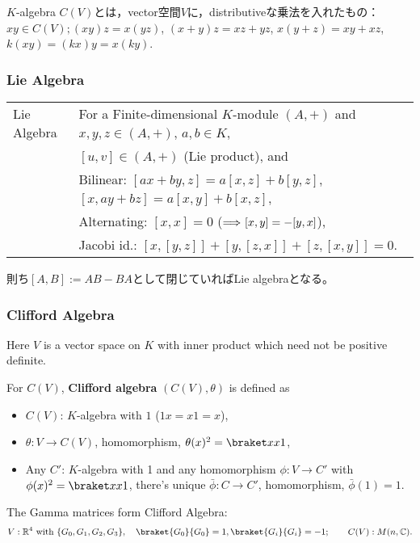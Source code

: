 \vspace{.5zw}

$K$-algebra $C(V)$とは，vector空間$V$に，distributiveな乗法を入れたもの：\\
\qquad$xy\in C(V);$\quad $(xy)z=x(yz)$, $(x+y)z=xz+yz$, $x(y+z)=xy+xz$, $k(xy)=(kx)y=x(ky)$.

\subsubsection{Lie Algebra}
\begin{tabular}{l@{ :\ \ \ }l}
Lie Algebra & For a Finite-dimensional $K$-module $(A,+)$ and $x,y,z\in(A,+)$, $a,b\in K$,\\
            & \quad $[u,v]\in (A,+)$ (Lie product), and\\
            & \quad Bilinear: $[ax+by, z] = a[x,z]+b[y,z]$, $[x, ay+bz] = a[x,y]+b[x,z]$,\\
            & \quad Alternating: $[x,x]=0$ \quad ($\mbox{$\Longrightarrow$\ } [x,y]=-[y,x]$),\\
            & \quad Jacobi id.: $[x,[y,z]]+[y,[z,x]]+[z,[x,y]]=0$.\\
\end{tabular}\par
則ち$[A,B]:=AB-BA$として閉じていればLie algebraとなる。
\subsubsection{Clifford Algebra}
Here $V$ is a vector space on $K$ with inner product which need not be positive definite.

For $C(V)$, {\bf Clifford algebra} $(C(V),\theta)$ is defined as
\begin{itemize}
 \item $C(V)$: $K$-algebra with $1$ \quad ($1x=x1=x$),
 \item $\theta: V\to C(V)$, homomorphism, $\theta(x)^2 = \braket xx1$,
 \item Any $C'$: $K$-algebra with 1 and any homomorphism $\phi: V\to C'$ with $\phi(x)^2=\braket xx1$, there's unique $\bar\phi: C\to C'$, homomorphism, $\bar\phi(1)=1$.
\end{itemize}
\begin{rightnote}
The Gamma matrices form Clifford Algebra:
\[
  V: \Real^4 \text{ with } \{G_0, G_1, G_2, G_3\},\quad
  \braket{G_0}{G_0}=1, \braket{G_i}{G_i}=-1; \qquad
  C(V): M(n,\Complex).
\]\vspace{-2zw}
\end{rightnote}

